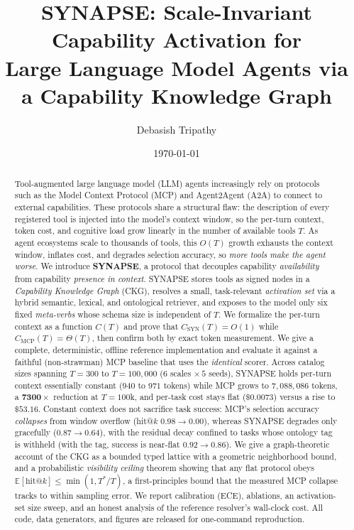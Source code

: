\documentclass[11pt]{article}
\title{\textbf{SYNAPSE: Scale-Invariant Capability Activation for\\ Large Language Model Agents via a Capability Knowledge Graph}}
\author{Debasish Tripathy}
\date{\today}
\theoremstyle{plain}
\theoremstyle{definition}
\begin{document}
\maketitle

\begin{abstract}
Tool-augmented large language model (LLM) agents increasingly rely on protocols
such as the Model Context Protocol (MCP) and Agent2Agent (A2A) to connect to
external capabilities. These protocols share a structural flaw: the description
of every registered tool is injected into the model's context window, so the
per-turn context, token cost, and cognitive load grow linearly in the number of
available tools $T$. As agent ecosystems scale to thousands of tools, this
$O(T)$ growth exhausts the context window, inflates cost, and degrades
selection accuracy, so \emph{more tools make the agent worse}. We introduce
\textbf{SYNAPSE}, a protocol that decouples capability \emph{availability} from
capability \emph{presence in context}. SYNAPSE stores tools as signed nodes in a
\emph{Capability Knowledge Graph} (CKG), resolves a small, task-relevant
\emph{activation set} via a hybrid semantic, lexical, and ontological retriever,
and exposes to the model only six fixed \emph{meta-verbs} whose schema size is
independent of $T$. We formalize the per-turn context as a function $C(T)$ and
prove that $C_{\mathrm{SYN}}(T)=O(1)$ while $C_{\mathrm{MCP}}(T)=\Theta(T)$, then
confirm both by exact token measurement. We give a complete, deterministic,
offline reference implementation and evaluate it against a faithful
(non-strawman) MCP baseline that uses the \emph{identical} scorer. Across catalog
sizes spanning $T{=}300$ to $T{=}100{,}000$ ($6$ scales $\times\,5$ seeds),
SYNAPSE holds per-turn context essentially constant ($940$ to $971$ tokens) while
MCP grows to $7{,}088{,}086$ tokens, a $\mathbf{7300\times}$ reduction at
$T{=}100$k, and per-task cost stays flat ($\$0.0073$) versus a rise to
$\mathbf{\$53.16}$. Constant context does not sacrifice task success: MCP's
selection accuracy \emph{collapses} from window overflow (hit@$k$
$0.98\to0.00$), whereas SYNAPSE degrades only gracefully ($0.87\to0.64$), with
the residual decay confined to tasks whose ontology tag is withheld (with the
tag, success is near-flat $0.92\to0.86$). We give a graph-theoretic account of
the CKG as a bounded typed lattice with a geometric neighborhood bound, and a
probabilistic \emph{visibility ceiling} theorem showing that any flat protocol
obeys $\mathbb{E}[\text{hit@}k]\le\min(1,T^{*}/T)$, a first-principles bound that
the measured MCP collapse tracks to within sampling error. We report calibration
(ECE), ablations, an activation-set size sweep, and an honest analysis of the
reference resolver's wall-clock cost. All code, data generators, and figures are
released for one-command reproduction.
\end{abstract}
\end{document}
